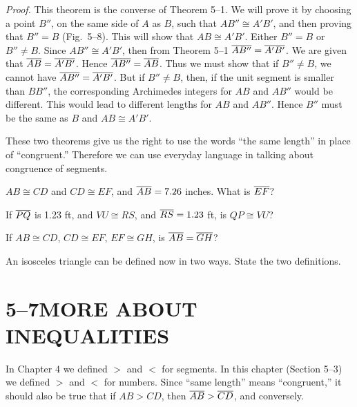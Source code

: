 \documentclass[11pt]{book}
\begin{document}
\noindent\emph{Proof.} This theorem is the converse of Theorem 5--1. We will
prove it by choosing a point $B''$, on the same side of $A$ as $B$, such that
$AB'' \cong A'B'$, and then proving that $B'' = B$ (Fig.~5--8). This will show
that $AB \cong A'B'$. Either $B'' = B$ or $B'' \neq B$. Since
$AB'' \cong A'B'$, then from Theorem 5--1 $\overline{AB''} = \overline{A'B'}$. We are given
that $\overline{AB} = \overline{A'B'}$. Hence $\overline{AB''} = \overline{AB}$. Thus we must show that
if $B'' \neq B$, we cannot have $\overline{AB''} = \overline{A'B'}$. But if $B'' \neq B$,
then, if the unit segment is smaller than $BB''$, the corresponding Archimedes
integers for $AB$ and $AB''$ would be different. This would lead to different
lengths for $AB$ and $AB''$. Hence $B''$ must be the same as $B$ and
$AB \cong A'B'$.

\FIGVEIGHT

These two theorems give us the right to use the words ``the same length'' in
place of ``congruent.'' Therefore we can use everyday language in talking about
congruence of segments.


\begin{exercisecols}
\begin{exlist}
\item $AB \cong CD$ and $CD \cong EF$, and $\overline{AB} = 7.26$ inches. What is
      $\overline{EF}$?
\item If $\overline{PQ}$ is 1.23 ft, and $VU \cong RS$, and $\overline{RS} = 1.23$ ft, is
      $QP \cong VU$?
\item If $AB \cong CD$, $CD \cong EF$, $EF \cong GH$, is $\overline{AB} = \overline{GH}$?
\item An isosceles triangle can be defined now in two ways. State the two
      definitions.
\end{exlist}
\end{exercisecols}

\section*{5--7\quad MORE ABOUT INEQUALITIES}

In Chapter 4 we defined $>$ and $<$ for segments. In this chapter (Section
5--3) we defined $>$ and $<$ for numbers. Since ``same length'' means
``congruent,'' it should also be true that if $AB > CD$, then
$\overline{AB} > \overline{CD}$, and conversely.
\end{document}
